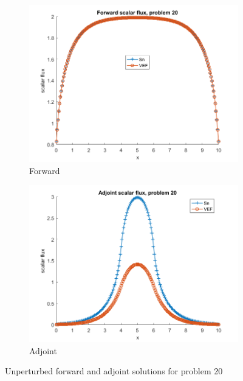 \documentclass{article}
\begin{document}
\begin{figure}[H]
\centering
\begin{subfigure}{.5\textwidth}
  \centering
  \includegraphics[width=1\linewidth]{p20f.png}
  \caption{Forward}
  \label{fig:sub1}
\end{subfigure}%
\begin{subfigure}{.5\textwidth}
  \centering
  \includegraphics[width=1\linewidth]{p20a.png}
  \caption{Adjoint}
  \label{fig:sub2}
\end{subfigure}
\caption{Unperturbed forward and adjoint solutions for problem 20}
\label{fig:test}
\end{figure}
\end{document}

